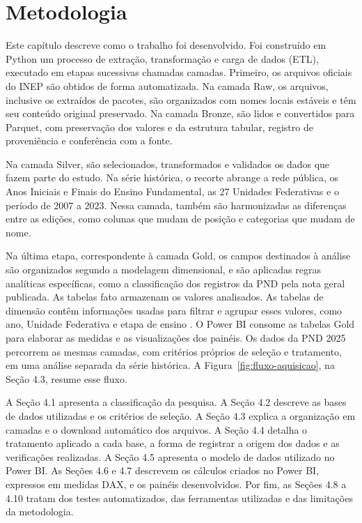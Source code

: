 \chapter[Metodologia]{Metodologia}

Este capítulo descreve como o trabalho foi desenvolvido. Foi construído em Python um processo de extração, transformação e carga de dados (ETL), executado em etapas sucessivas chamadas camadas. Primeiro, os arquivos oficiais do INEP são obtidos de forma automatizada. Na camada Raw, os arquivos, inclusive os extraídos de pacotes, são organizados com nomes locais estáveis e têm seu conteúdo original preservado. Na camada Bronze, são lidos e convertidos para Parquet, com preservação dos valores e da estrutura tabular, registro de proveniência e conferência com a fonte.

Na camada Silver, são selecionados, transformados e validados os dados que fazem parte do estudo. Na série histórica, o recorte abrange a rede pública, os Anos Iniciais e Finais do Ensino Fundamental, as 27 Unidades Federativas e o período de 2007 a 2023. Nessa camada, também são harmonizadas as diferenças entre as edições, como colunas que mudam de posição e categorias que mudam de nome.

Na última etapa, correspondente à camada Gold, os campos destinados à análise são organizados segundo a modelagem dimensional, e são aplicadas regras analíticas específicas, como a classificação dos registros da PND pela nota geral publicada. As tabelas fato armazenam os valores analisados. As tabelas de dimensão contêm informações usadas para filtrar e agrupar esses valores, como ano, Unidade Federativa e etapa de ensino \cite{kimball2013data}. O Power BI consome as tabelas Gold para elaborar as medidas e as visualizações dos painéis. Os dados da PND 2025 percorrem as mesmas camadas, com critérios próprios de seleção e tratamento, em uma análise separada da série histórica. A Figura~\ref{fig:fluxo-aquisicao}, na Seção 4.3, resume esse fluxo.

A Seção 4.1 apresenta a classificação da pesquisa. A Seção 4.2 descreve as bases de dados utilizadas e os critérios de seleção. A Seção 4.3 explica a organização em camadas e o download automático dos arquivos. A Seção 4.4 detalha o tratamento aplicado a cada base, a forma de registrar a origem dos dados e as verificações realizadas. A Seção 4.5 apresenta o modelo de dados utilizado no Power BI. As Seções 4.6 e 4.7 descrevem os cálculos criados no Power BI, expressos em medidas DAX, e os painéis desenvolvidos. Por fim, as Seções 4.8 a 4.10 tratam dos testes automatizados, das ferramentas utilizadas e das limitações da metodologia.

